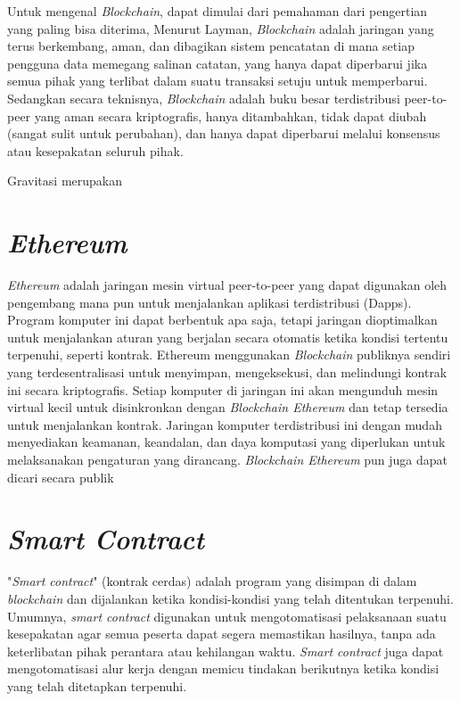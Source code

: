 Untuk mengenal \emph{Blockchain}, dapat dimulai dari pemahaman dari pengertian yang paling bisa diterima,
Menurut Layman, \emph{Blockchain} adalah jaringan yang terus berkembang, aman, dan dibagikan sistem pencatatan
di mana setiap pengguna data memegang salinan catatan, yang hanya dapat diperbarui jika semua pihak yang
terlibat dalam suatu transaksi setuju untuk memperbarui. Sedangkan secara teknisnya, \emph{Blockchain} adalah buku besar
terdistribusi peer-to-peer yang aman secara kriptografis, hanya ditambahkan, tidak dapat diubah (sangat sulit untuk perubahan),
dan hanya dapat diperbarui melalui konsensus atau kesepakatan seluruh pihak.

Gravitasi merupakan \lipsum[1]

\section{\emph{Ethereum}}
\emph{Ethereum} adalah jaringan mesin virtual peer-to-peer yang dapat digunakan oleh pengembang mana pun untuk menjalankan aplikasi
terdistribusi (Dapps). Program komputer ini dapat berbentuk apa saja, tetapi jaringan dioptimalkan untuk menjalankan aturan yang
berjalan secara otomatis ketika kondisi tertentu terpenuhi, seperti kontrak. Ethereum menggunakan \emph{Blockchain} publiknya sendiri yang
terdesentralisasi untuk menyimpan, mengeksekusi, dan melindungi kontrak ini secara kriptografis. Setiap komputer di jaringan ini akan
mengunduh mesin virtual kecil untuk disinkronkan dengan \emph{Blockchain Ethereum} dan tetap tersedia untuk menjalankan kontrak.
Jaringan komputer terdistribusi ini dengan mudah menyediakan keamanan, keandalan, dan daya komputasi yang diperlukan untuk melaksanakan
pengaturan yang dirancang. \emph{Blockchain Ethereum} pun juga dapat dicari secara publik

\section{\emph{Smart Contract}}

"\emph{Smart contract}" (kontrak cerdas) adalah program yang disimpan di dalam \emph{blockchain} dan dijalankan ketika
kondisi-kondisi yang telah ditentukan terpenuhi. Umumnya, \emph{smart contract} digunakan untuk mengotomatisasi
pelaksanaan suatu kesepakatan agar semua peserta dapat segera memastikan hasilnya, tanpa ada keterlibatan pihak
perantara atau kehilangan waktu. \emph{Smart contract} juga dapat mengotomatisasi alur kerja dengan memicu tindakan
berikutnya ketika kondisi yang telah ditetapkan terpenuhi.

